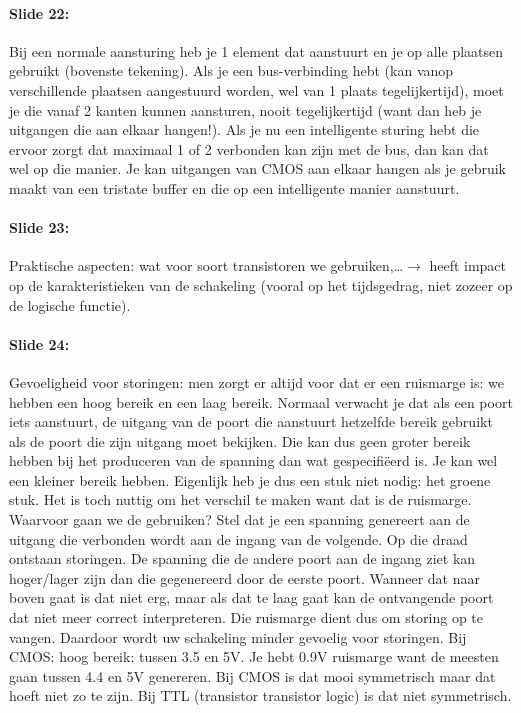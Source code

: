 \documentclass[10pt,a4paper]{book}
\begin{document}
\paragraph{Slide 22:} Bij een normale aansturing heb je 1 element dat aanstuurt en je op alle plaatsen gebruikt (bovenste tekening). Als je een bus-verbinding hebt (kan vanop verschillende plaatsen aangestuurd worden, wel van 1 plaats tegelijkertijd), moet je die vanaf 2 kanten kunnen aansturen, nooit tegelijkertijd (want dan heb je uitgangen die aan elkaar hangen!). Als je nu een intelligente sturing hebt die ervoor zorgt dat maximaal 1 of 2 verbonden kan zijn met de bus, dan kan dat wel op die manier. Je kan uitgangen van CMOS aan elkaar hangen als je gebruik maakt van een tristate buffer en die op een intelligente manier aanstuurt. 

\paragraph{Slide 23:} Praktische aspecten: wat voor soort transistoren we gebruiken,\ldots $\rightarrow$ heeft impact op de karakteristieken van de schakeling (vooral op het tijdsgedrag, niet zozeer op de logische functie). 

\paragraph{Slide 24:} Gevoeligheid voor storingen: men zorgt er altijd voor dat er een ruismarge is: we hebben een hoog bereik en een laag bereik. Normaal verwacht je dat als een poort iets aanstuurt, de uitgang van de poort die aanstuurt hetzelfde bereik gebruikt als de poort die zijn uitgang moet bekijken. Die kan dus geen groter bereik hebben bij het produceren van de spanning dan wat gespecifi\"eerd is. Je kan wel een kleiner bereik hebben. Eigenlijk heb je dus een stuk niet nodig: het groene stuk. Het is toch nuttig om het verschil te maken want dat is de ruismarge. Waarvoor gaan we de gebruiken? Stel dat je een spanning genereert aan de uitgang die verbonden wordt aan de ingang van de volgende. Op die draad ontstaan storingen. De spanning die de andere poort aan de ingang ziet kan hoger/lager zijn dan die gegenereerd door de eerste poort. Wanneer dat naar boven gaat is dat niet erg, maar als dat te laag gaat kan de ontvangende poort dat niet meer correct interpreteren. Die ruismarge dient dus om storing op te vangen. Daardoor wordt uw schakeling minder gevoelig voor storingen. Bij CMOS: hoog bereik: tussen 3.5 en 5V. Je hebt 0.9V ruismarge want de meesten gaan tussen 4.4 en 5V genereren.
Bij CMOS is dat mooi symmetrisch maar dat hoeft niet zo te zijn. Bij TTL (transistor transistor logic) is dat niet symmetrisch. 
\end{document}
